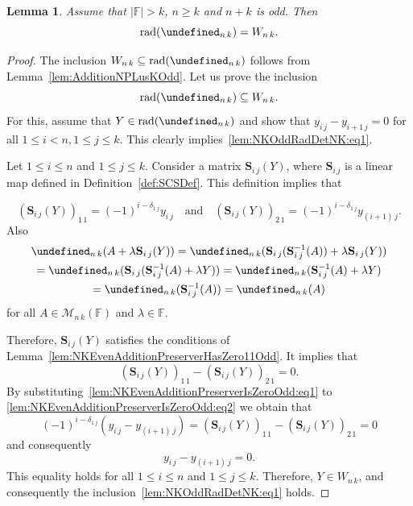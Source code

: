 \documentclass{elsarticle}
\DeclareMathOperator{\rad}{rad}
\def\F{{\mathbb F}}
\def\M{{\mathcal M}}
\def\SCS{{\mathbf S}}
\let\det\undefined
\DeclareMathOperator{\det}{det}
\theoremstyle{plain}
\newtheorem{lemma}[theorem]{Lemma}
\theoremstyle{definition}
\numberwithin{equation}{section}
\begin{document}
\begin{lemma}\label{lem:NKOddRadDetNK}Assume that $|\F| > k$, $n \ge k$ and $n + k$ is odd. Then 
\begin{equation}\label{lem:NKOddRadDetNK:eqq}
\rad(\det_{n\,k}) =  W_{n\,k}.
\end{equation}
\end{lemma}
\begin{proof}
The inclusion $W_{n\,k} \subseteq \rad(\det_{n\,k})$  follows from Lemma~\ref{lem:AdditionNPLusKOdd}. Let us prove the inclusion 
\begin{equation}\label{lem:NKOddRadDetNK:eq1}
\rad(\det_{n\,k}) \subseteq  W_{n\,k}.
\end{equation}
For this, assume that $Y \in \rad(\det_{n\,k})$ and show that $y_{i\,j} - y_{i+1\,j}= 0$ for all $1 \le i < n, 1 \le j \le k.$ This clearly implies~\eqref{lem:NKOddRadDetNK:eq1}.

Let $1 \le i \le n$ and $1 \le j \le k$. Consider a matrix $\SCS_{i\,j}(Y)$, where $\SCS_{i\,j}$ is a linear map defined in Definition~\ref{def:SCSDef}. This definition implies that

\begin{equation}\label{lem:NKEvenAdditionPreserverIsZeroOdd:eq1}
\left(\SCS_{i\,j}(Y)\right)_{1\,1} = (-1)^{i - \delta_{1\,j}}y_{i\,j}\quad\mbox{and}\quad \left(\SCS_{i\,j}(Y)\right)_{2\,1} = (-1)^{i - \delta_{1\,j}}y_{(i+1)\,j}.
\end{equation}
Also
\begin{multline*}
\det_{n\,k} (A + \lambda \SCS_{i\,j}(Y)) = \det_{n\,k} (\SCS_{i\,j}(\SCS_{i\,j}^{-1}(A)) + \lambda \SCS_{i\,j}(Y))\\
= \det_{n\,k} (\SCS_{i\,j}(\SCS_{i\,j}^{-1}(A) + \lambda Y)) = \det_{n\,k} (\SCS_{i\,j}^{-1}(A) + \lambda Y)\\
= \det_{n\,k} (\SCS_{i\,j}^{-1}(A)) = \det_{n\,k}(A)
\end{multline*}
for all $A \in \M_{n\,k}(\F)$ and $\lambda \in \F$.

Therefore, $\SCS_{i\,j}(Y)$ satisfies the conditions of Lemma~\ref{lem:NKEvenAdditionPreserverHasZero11Odd}. It implies that
\begin{equation}\label{lem:NKEvenAdditionPreserverIsZeroOdd:eq2}
\left(\SCS_{i\,j}(Y)\right)_{1\,1} - \left(\SCS_{i\,j}(Y)\right)_{2\,1}  = 0.
\end{equation}
By substituting~\eqref{lem:NKEvenAdditionPreserverIsZeroOdd:eq1} to \eqref{lem:NKEvenAdditionPreserverIsZeroOdd:eq2} we obtain that
\[
(-1)^{i - \delta_{1\,j}}\left(y_{i\,j} - y_{(i+1)\,j}\right) = \left(\SCS_{i\,j}(Y)\right)_{1\,1} - \left(\SCS_{i\,j}(Y)\right)_{2\,1}= 0
\]
and consequently
\[
y_{i\,j} - y_{(i+1)\,j} = 0.
\]
This equality holds for all  $1 \le i \le n$ and $1 \le j \le k$. Therefore, $Y \in W_{n\,k}$, and consequently the inclusion~\eqref{lem:NKOddRadDetNK:eq1} holds.
\end{proof}
\end{document}

